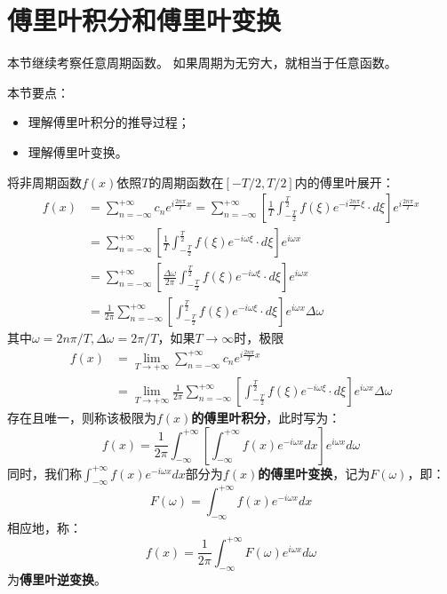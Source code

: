 \section{傅里叶积分和傅里叶变换}

本节继续考察任意周期函数。
如果周期为无穷大，就相当于任意函数。

本节要点：
\begin{itemize}
    \item 理解傅里叶积分的推导过程；
    \item 理解傅里叶变换。
\end{itemize}

\begin{definition}[傅里叶积分]
将非周期函数$f\left( x \right) $依照$T$的周期函数在$\left[ -T/2,T/2 \right] $内的傅里叶展开：
\begin{align*}
f\left( x \right) &=\sum_{n=-\infty}^{+\infty}{c_ne^{i\frac{2n\pi}{T}x}}=\sum_{n=-\infty}^{+\infty}{\left[ \frac{1}{T}\int_{-\frac{T}{2}}^{\frac{T}{2}}{f\left( \xi \right) e^{-i\frac{2n\pi}{T}\xi}\cdot d\xi} \right] e^{i\frac{2n\pi}{T}x}} \\
&=\sum_{n=-\infty}^{+\infty}{\left[ \frac{1}{T}\int_{-\frac{T}{2}}^{\frac{T}{2}}{f\left( \xi \right) e^{-i\omega \xi}\cdot d\xi} \right] e^{i\omega x}} \\
&=\sum_{n=-\infty}^{+\infty}{\left[ \frac{\Delta \omega}{2\pi}\int_{-\frac{T}{2}}^{\frac{T}{2}}{f\left( \xi \right) e^{-i\omega \xi}\cdot d\xi} \right] e^{i\omega x}} \\
&=\frac{1}{2\pi}\sum_{n=-\infty}^{+\infty}{\left[ \int_{-\frac{T}{2}}^{\frac{T}{2}}{f\left( \xi \right) e^{-i\omega \xi}\cdot d\xi} \right] e^{i\omega x}\Delta \omega}
\end{align*}
其中$\omega =2n\pi /T,\Delta \omega =2\pi /T$，如果$T\rightarrow \infty $时，极限
\begin{align*}
f\left( x \right) &=\underset{T\rightarrow +\infty}{\lim}\sum_{n=-\infty}^{+\infty}{c_ne^{i\frac{2n\pi}{T}x}} \\
&=\underset{T\rightarrow +\infty}{\lim}\frac{1}{2\pi}\sum_{n=-\infty}^{+\infty}{\left[ \int_{-\frac{T}{2}}^{\frac{T}{2}}{f\left( \xi \right) e^{-i\omega \xi}\cdot d\xi} \right] e^{i\omega x}\Delta \omega}
\end{align*}
存在且唯一，则称该极限为{\bf $f\left( x \right) $的傅里叶积分}，此时写为：
\[
f\left( x \right) =\frac{1}{2\pi}\int_{-\infty}^{+\infty}{\left[ \int_{-\infty}^{+\infty}{f\left( x \right) e^{-i\omega x}dx} \right] e^{i\omega x}d\omega}
\]
同时，我们称$\int_{-\infty}^{+\infty}{f\left( x \right) e^{-i\omega x}dx}$部分为{\bf $f\left( x \right) $的傅里叶变换}，记为$F\left( \omega \right) $，即：
\[
F\left( \omega \right) =\int_{-\infty}^{+\infty}{f\left( x \right) e^{-i\omega x}dx}
\]
相应地，称：
\[
f\left( x \right) =\frac{1}{2\pi}\int_{-\infty}^{+\infty}{F\left( \omega \right) e^{i\omega x}d\omega}
\]
为{\bf 傅里叶逆变换}。
\end{definition}

